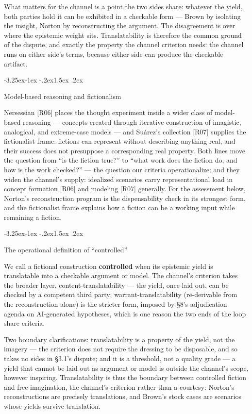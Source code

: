 \documentclass[11pt,a4paper]{article}
\makeatletter
\renewcommand\subsection{\@startsection{subsection}{2}{\z@}%
  {-3.25ex\@plus -1ex \@minus -.2ex}{1.5ex \@plus .2ex}%
  {\normalfont\large\bfseries\raggedright}}
\makeatother
\begin{document}
What matters for the channel is a point the two sides share: whatever the yield, both parties hold it can be exhibited in a checkable form — Brown by isolating the insight, Norton by reconstructing the argument. The disagreement is over where the epistemic weight sits. Translatability is therefore the common ground of the dispute, and exactly the property the channel criterion needs: the channel runs on either side's terms, because either side can produce the checkable artifact.

\subsection{Model-based reasoning and fictionalism}

Nersessian [R06] places the thought experiment inside a wider class of model-based reasoning — concepts created through iterative construction of imagistic, analogical, and extreme-case models — and Suárez's collection [R07] supplies the fictionalist frame: fictions can represent without describing anything real, and their success does not presuppose a corresponding real property. Both lines move the question from ``is the fiction true?'' to ``what work does the fiction do, and how is the work checked?'' — the question our criteria operationalize; and they widen the channel's supply: idealized scenarios carry representational load in concept formation [R06] and modeling [R07] generally. For the assessment below, Norton's reconstruction program is the dispensability check in its strongest form, and the fictionalist frame explains how a fiction can be a working input while remaining a fiction.

\subsection{The operational definition of ``controlled''}

We call a fictional construction \textbf{controlled} when its epistemic yield is translatable into a checkable argument or model. The channel's criterion takes the broader layer, content-translatability — the yield, once laid out, can be checked by a competent third party; warrant-translatability (re-derivable from the reconstruction alone) is the stricter form, imposed by §8's adjudication agenda on AI-generated hypotheses, which is one reason the two ends of the loop share criteria.

Two boundary clarifications: translatability is a property of the yield, not the imagery — the criterion does not require the dressing to be disposable, and so takes no sides in §3.1's dispute; and it is a threshold, not a quality grade — a yield that cannot be laid out as argument or model is outside the channel's scope, however inspiring. Translatability is thus the boundary between controlled fiction and free imagination, the channel's criterion rather than a courtesy: Norton's reconstructions are precisely translations, and Brown's stock cases are scenarios whose yields survive translation.
\end{document}
